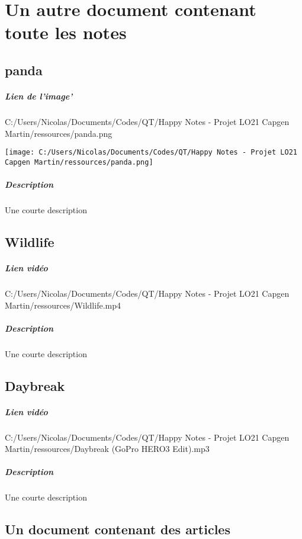 \documentclass[a4paper,11pt]{report}
\begin{document}
\chapter{Un autre document contenant toute les notes}
\section{panda}
\paragraph{Lien de l'image'}C:/Users/Nicolas/Documents/Codes/QT/Happy Notes - Projet LO21 Capgen Martin/ressources/panda.png
\begin{center}
\texttt{[image: C:/Users/Nicolas/Documents/Codes/QT/Happy Notes - Projet LO21 Capgen Martin/ressources/panda.png]}
\end{center}
\paragraph{Description}Une courte description
\section{Wildlife}
\paragraph{Lien vidéo}C:/Users/Nicolas/Documents/Codes/QT/Happy Notes - Projet LO21 Capgen Martin/ressources/Wildlife.mp4
\paragraph{Description}Une courte description
\section{Daybreak}
\paragraph{Lien vidéo}C:/Users/Nicolas/Documents/Codes/QT/Happy Notes - Projet LO21 Capgen Martin/ressources/Daybreak (GoPro HERO3 Edit).mp3
\paragraph{Description}Une courte description
\section{Un document contenant des articles}
\end{document}
